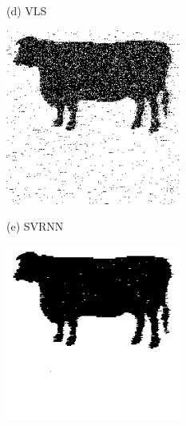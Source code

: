 \documentclass{article}
\begin{document}
\begin{figure}[htb]
\begin{minipage}[b]{0.30\linewidth}
        \centerline{(d) VLS}\medskip      \end{minipage}
      \hfill
      \begin{minipage}[b]{.30\linewidth}
        \centering
        \centerline{\includegraphics[width=\textwidth,cfbox=black 1pt 0pt]{ress/cow40/cow40_svrnn_2.png}}
        \centerline{(e) SVRNN}\medskip
      \end{minipage}
      \hfill
      \begin{minipage}[b]{0.30\linewidth}
        \centering
        \centerline{\includegraphics[width=\textwidth,cfbox=black 1pt 0pt]{ress/cow40/cow40_tmm_3.png}}

\end{minipage}
\end{figure}
\end{document}
